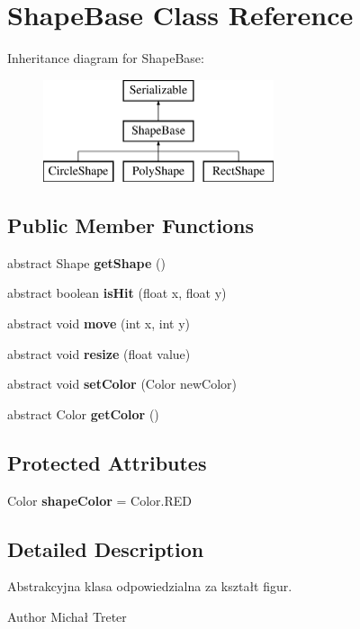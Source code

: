 \section{Shape\+Base Class Reference}
\label{class_shape_base}
Inheritance diagram for Shape\+Base\+:\begin{figure}[H]
\begin{center}
\leavevmode
\includegraphics[height=3.000000cm]{class_shape_base}
\end{center}
\end{figure}
\subsection*{Public Member Functions}
\begin{DoxyCompactItemize}
\item 
abstract Shape \textbf{ get\+Shape} ()
\item 
abstract boolean \textbf{ is\+Hit} (float x, float y)
\item 
abstract void \textbf{ move} (int x, int y)
\item 
abstract void \textbf{ resize} (float value)
\item 
abstract void \textbf{ set\+Color} (Color new\+Color)
\item 
abstract Color \textbf{ get\+Color} ()
\end{DoxyCompactItemize}
\subsection*{Protected Attributes}
\begin{DoxyCompactItemize}
\item 
Color \textbf{ shape\+Color} = Color.\+R\+ED
\end{DoxyCompactItemize}


\subsection{Detailed Description}
Abstrakcyjna klasa odpowiedzialna za kształt figur. \begin{DoxyAuthor}{Author}
Michał Treter 
\end{DoxyAuthor}


